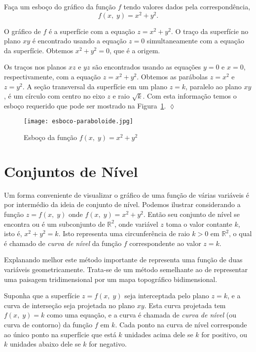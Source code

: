 \begin{exer}
	Faça um esboço do gráfico da função \(f\) tendo valores dados pela correspondência,
	\begin{equation*}
		f(x,\; y) = x^{2}+y^{2}.
	\end{equation*}
\end{exer}

\solo
O gráfico de \(f\) é a superfície com a equação \(z = x^{2}+y^{2}\). O traço da superfície no plano \(xy\) é encontrado usando a equação \(z=0\) 
simultaneamente com a equação da superfície. Obtemos \(x^{2}+y^{2}=0\), que é a origem.

Os traços nos planos \(xz\) e \(yz\) são encontrados usando as equações \(y=0\) e \(x=0\), respectivamente, com a equação \(z=x^{2}+y^{2}\).
Obtemos as parábolas \(z=x^{2}\) e \(z = y^{2}\). A seção transversal da superfície em um plano \(z = k\), paralelo ao plano \(xy\), é um círculo com 
centro no eixo \(z\) e raio \(\sqrt{k}\). Com esta informação temos o esboço requerido que pode ser  mostrado na Figura~\ref{fig:17-1-6}.
\hfill \(\lozenge\)

%
\begin{figure}[H]
	\centering
	\texttt{[image: esboco-paraboloide.jpg]}
	\caption{Esboço da função \(f(x,\; y) = x^{2}+y^{2}\)}
	\label{fig:17-1-6}
\end{figure}
%


\section{\textcolor[rgb]{0.98,0.00,0.00}{Conjuntos de Nível}}
%
Um forma conveniente de visualizar o gráfico de uma função de várias variáveis é por intermédio da ideia de conjunto de nível. Podemos ilustrar 
considerando a função $z=f(x,\; y)$ onde $f(x,\; y)=x^2+y^2$. Então seu conjunto de nível se encontra ou é um subconjunto de $\mathbb{R}^2$, onde variável 
$z$ toma o valor contante $k$, isto é, $x^2+y^2=k$. Isto representa uma circunferência de raio $k>0$ em $\mathbb{R}^2$, o qual é chamado de \emph{curva de 
	nível} da função $f$ correspondente ao valor $z=k$.

Explanando melhor este método importante de representa uma função de duas variáveis geometricamente. Trata-se de um método semelhante ao de representar 
uma paisagem tridimensional por um mapa topográfico bidimensional.

Suponha que a superfície \(z = f(x, \; y)\) seja interceptada pelo plano \(z=k\), e a curva de interseção seja projetada no plano \(xy\). Esta curva 
projetada tem \(f(x,\; y) = k\) como uma equação, e a curva é chamada de \textit{curva de nível} (ou curva de contorno) da função \(f\) em \(k\). Cada 
ponto na curva de nível corresponde ao único ponto na superfície que está \(k\) unidades acima dele se \(k\) for positivo, ou \(k\) unidades abaixo dele 
se \(k\) for negativo.

